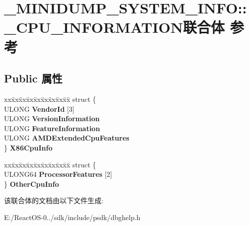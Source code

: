 \hypertarget{union___m_i_n_i_d_u_m_p___s_y_s_t_e_m___i_n_f_o_1_1___c_p_u___i_n_f_o_r_m_a_t_i_o_n}{}\section{\+\_\+\+M\+I\+N\+I\+D\+U\+M\+P\+\_\+\+S\+Y\+S\+T\+E\+M\+\_\+\+I\+N\+FO\+:\+:\+\_\+\+C\+P\+U\+\_\+\+I\+N\+F\+O\+R\+M\+A\+T\+I\+O\+N联合体 参考}
\label{union___m_i_n_i_d_u_m_p___s_y_s_t_e_m___i_n_f_o_1_1___c_p_u___i_n_f_o_r_m_a_t_i_o_n}
\subsection*{Public 属性}
\begin{DoxyCompactItemize}
\item 
\mbox{\label{union___m_i_n_i_d_u_m_p___s_y_s_t_e_m___i_n_f_o_1_1___c_p_u___i_n_f_o_r_m_a_t_i_o_n_a43f5c7b9fcfecc177a5e009e22629931}} 
\begin{tabbing}
xx\=xx\=xx\=xx\=xx\=xx\=xx\=xx\=xx\=\kill
struct \{\\
\>ULONG {\bfseries VendorId} \mbox{[}3\mbox{]}\\
\>ULONG {\bfseries VersionInformation}\\
\>ULONG {\bfseries FeatureInformation}\\
\>ULONG {\bfseries AMDExtendedCpuFeatures}\\
\} {\bfseries X86CpuInfo}\\

\end{tabbing}\item 
\mbox{\label{union___m_i_n_i_d_u_m_p___s_y_s_t_e_m___i_n_f_o_1_1___c_p_u___i_n_f_o_r_m_a_t_i_o_n_a5ae5a7b306863b29d588af840387cc6f}} 
\begin{tabbing}
xx\=xx\=xx\=xx\=xx\=xx\=xx\=xx\=xx\=\kill
struct \{\\
\>ULONG64 {\bfseries ProcessorFeatures} \mbox{[}2\mbox{]}\\
\} {\bfseries OtherCpuInfo}\\

\end{tabbing}\end{DoxyCompactItemize}


该联合体的文档由以下文件生成\+:\begin{DoxyCompactItemize}
\item 
E\+:/\+React\+O\+S-\/0../sdk/include/psdk/dbghelp.\+h\end{DoxyCompactItemize}
